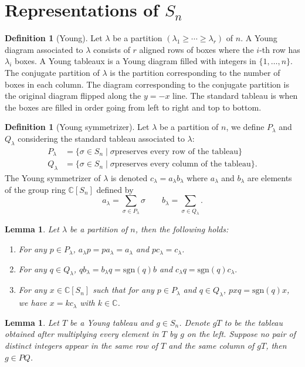 \documentclass[paper=a4, fontsize=12pt]{scrartcl} %
\newtheorem{lem}[thm]{Lemma}
\theoremstyle{definition}
\newtheorem{defn}[thm]{Definition}
\theoremstyle{remark}
\newcommand{\C}{\mathbb{C}}
\begin{document}
\section{Representations of $S_n$}
\begin{defn}[Young]
	Let $\lambda$ be a partition $(\lambda_1 \geq \cdots \geq \lambda_r)$ of $n$. A Young diagram associated to $\lambda$ consists of $r$ aligned rows of boxes where the $i$-th row has $\lambda_i$ boxes. A Young tableaux is a Young diagram filled with integers in $\{1,\dots, n\}$. The conjugate partition of $\lambda$ is the partition corresponding to the number of boxes in each column. The diagram corresponding to the conjugate partition is the original diagram flipped along the $y=-x$ line. The standard tableau is when the boxes are filled in order going from left to right and top to bottom.
\end{defn}
\begin{defn}[Young symmetrizer]
	Let $\lambda$ be a partition of $n$, we define $P_{\lambda}$ and $Q_{\lambda}$ considering the standard tableau associated to $\lambda$:
	\begin{align*}
	P_{\lambda} &= \{\sigma \in S_n \mid \sigma \text{preserves every row of the tableau}\}\\ Q_{\lambda} &= \{\sigma \in S_n \mid \sigma \text{preserves every column of the tableau}\}.
	\end{align*}
	The Young symmetrizer of $\lambda$ is denoted $c_{\lambda} = a_{\lambda}b_{\lambda}$ where $a_{\lambda}$ and $b_{\lambda}$ are elements of the group ring $\C[S_n]$ defined by 
	$$a_{\lambda} = \sum_{\sigma \in P_{\lambda}} \sigma \quad \quad b_{\lambda} = \sum_{\sigma \in Q_{\lambda}}.$$
\end{defn}
\begin{lem}
	Let $\lambda$ be a partition of $n$, then the following holds:
	\begin{enumerate}
		\item For any $p \in P_{\lambda}$, $a_{\lambda}p = pa_{\lambda} = a_{\lambda}$ and $pc_{\lambda} = c_{\lambda}$.
		\item For any $q \in Q_{\lambda}$, $qb_{\lambda} = b_{\lambda}q = \text{sgn}(q)b$ and $c_{\lambda}q = \text{sgn}(q)c_{\lambda}.$
		\item For any $x \in \C[S_n]$ such that for any $p \in P_{\lambda}$ and $q\in Q_{\lambda}$, $pxq= \text{sgn}(q)x$, we have $x = kc_{\lambda}$ with $k \in \C$.		
	\end{enumerate}
\end{lem}
\begin{lem}
	Let $T$ be a Young tableau and $g \in S_n$. Denote $gT$ to be the tableau obtained after multiplying every element in $T$ by $g$ on the left. Suppose no pair of distinct integers appear in the same row of $T$ and the same column of $gT$, then $g \in PQ$.
\end{lem}
\end{document}
